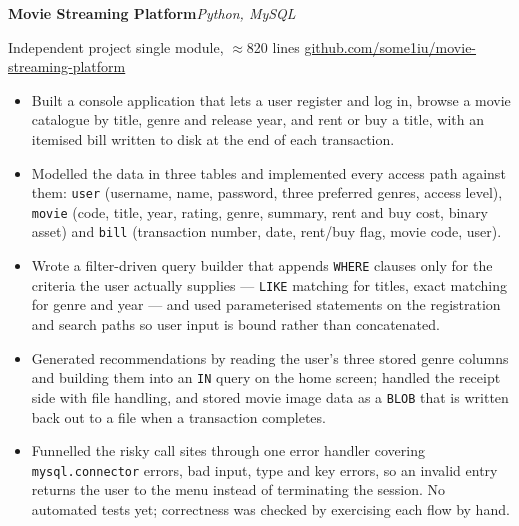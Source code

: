 \documentclass[10pt,a4paper]{article}
\newcommand{\project}[2]{%
  \par{\textbf{#1}}\hfill{\itshape\color{black!65}#2}\par}
\newcommand{\meta}[1]{%
  \par{\color{black!65}#1}\par\vspace{1pt}}
\begin{document}
\project{Movie Streaming Platform}{Python, MySQL}
\meta{Independent project \;\textbullet\; single module, $\approx$820 lines \;\textbullet\;
      \href{https://github.com/some1iu/movie-streaming-platform}%
           {github.com/some1iu/movie-streaming-platform}}
\begin{itemize}
  \item Built a console application that lets a user register and log in, browse a movie catalogue by
        title, genre and release year, and rent or buy a title, with an itemised bill written to disk
        at the end of each transaction.
  \item Modelled the data in three tables and implemented every access path against them: \texttt{user} (username, name, password, three preferred genres, access level),
        \texttt{movie} (code, title, year, rating, genre, summary, rent and buy cost, binary asset) and
        \texttt{bill} (transaction number, date, rent/buy flag, movie code, user).
  \item Wrote a filter-driven query builder that appends \texttt{WHERE} clauses only for the criteria
        the user actually supplies --- \texttt{LIKE} matching for titles, exact matching for genre and
        year --- and used parameterised statements on the registration and search paths so user input
        is bound rather than concatenated.
  \item Generated recommendations by reading the user's three stored genre columns and building them
        into an \texttt{IN} query on the home screen; handled the receipt side with file handling, and
        stored movie image data as a \texttt{BLOB} that is written back out to a file when a
        transaction completes.
  \item Funnelled the risky call sites through one error handler covering
        \texttt{mysql.connector} errors, bad input, type and key errors, so an invalid entry returns
        the user to the menu instead of terminating the session. No automated tests yet; correctness
        was checked by exercising each flow by hand.
\end{itemize}
\end{document}
